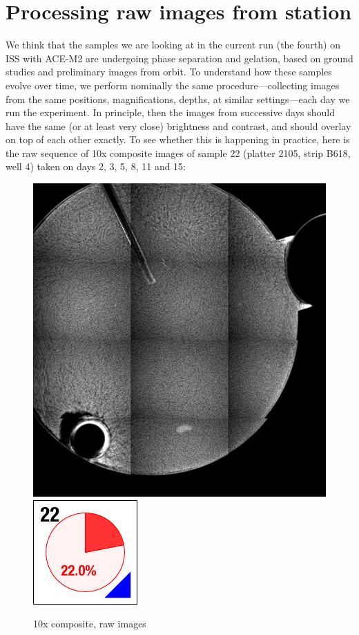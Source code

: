 \section{Processing raw images from
station}\hypertarget{raw-data-from-station}{}\label{raw-data-from-station} We think that the samples we are looking at in the current run (the fourth) on
ISS with ACE-M2 are undergoing phase separation and gelation, based on ground
studies and preliminary images from orbit. To understand how these samples
evolve over time, we perform nominally the same procedure---collecting images
from the same positions, magnifications, depths, at similar settings---each day
we run the experiment. In principle, then the images from successive days should
have the same (or at least very close) brightness and contrast, and should
overlay on top of each other exactly. To see whether this is happening in
practice, here is the raw sequence of 10x composite images of sample 22 (platter
2105, strip B618, well 4) taken on days 2, 3, 5, 8, 11 and 15:
\begin{figure}[h]
\begin{center}
\includegraphics[width=\columnwidth]{./images/2014_07_27_ace_m2_run4_s22_gel/w9s22_10x_days02to15_resize.png}
\includegraphics{./images/ace_m2_sample_tiles/sample22.png}
\caption{10x composite, raw images}
\end{center}
\end{figure}

